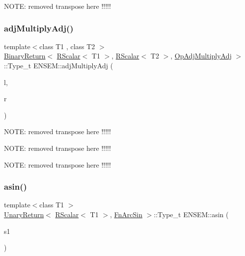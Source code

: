 N\+O\+TE\+: removed transpose here !!!!! \mbox{\label{group__rscalar_ga98ba0296fc190036d2587357efbd8ca2}} 
\subsubsection{\texorpdfstring{adjMultiplyAdj()}{adjMultiplyAdj()}}
{\footnotesize\ttfamily template$<$class T1 , class T2 $>$ \\
\mbox{\hyperlink{structENSEM_1_1BinaryReturn}{Binary\+Return}}$<$ \mbox{\hyperlink{classENSEM_1_1RScalar}{R\+Scalar}}$<$ T1 $>$, \mbox{\hyperlink{classENSEM_1_1RScalar}{R\+Scalar}}$<$ T2 $>$, \mbox{\hyperlink{structENSEM_1_1OpAdjMultiplyAdj}{Op\+Adj\+Multiply\+Adj}} $>$\+::Type\+\_\+t E\+N\+S\+E\+M\+::adj\+Multiply\+Adj (\begin{DoxyParamCaption}\item[{const \mbox{\hyperlink{classENSEM_1_1RScalar}{R\+Scalar}}$<$ T1 $>$ \&}]{l,  }\item[{const \mbox{\hyperlink{classENSEM_1_1RScalar}{R\+Scalar}}$<$ T2 $>$ \&}]{r }\end{DoxyParamCaption})\hspace{0.3cm}{\ttfamily [inline]}}

N\+O\+TE\+: removed transpose here !!!!!

N\+O\+TE\+: removed transpose here !!!!!

N\+O\+TE\+: removed transpose here !!!!! \mbox{\label{group__rscalar_ga74e5212c5ef434f0f0f94bf61b79f0fb}} 
\subsubsection{\texorpdfstring{asin()}{asin()}}
{\footnotesize\ttfamily template$<$class T1 $>$ \\
\mbox{\hyperlink{structENSEM_1_1UnaryReturn}{Unary\+Return}}$<$ \mbox{\hyperlink{classENSEM_1_1RScalar}{R\+Scalar}}$<$ T1 $>$, \mbox{\hyperlink{structENSEM_1_1FnArcSin}{Fn\+Arc\+Sin}} $>$\+::Type\+\_\+t E\+N\+S\+E\+M\+::asin (\begin{DoxyParamCaption}\item[{const \mbox{\hyperlink{classENSEM_1_1RScalar}{R\+Scalar}}$<$ T1 $>$ \&}]{s1 }\end{DoxyParamCaption})\hspace{0.3cm}{\ttfamily [inline]}}

